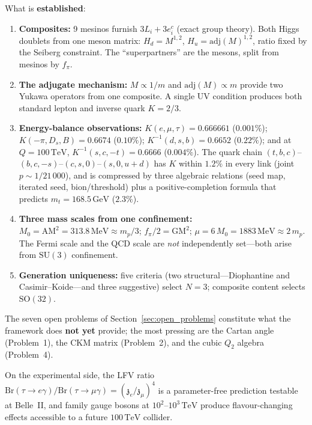 \documentclass[aps,prd,twocolumn,showpacs,preprintnumbers,superscriptaddress,floatfix]{revtex4-2}
\newcommand{\SU}{\mathrm{SU}}
\newcommand{\SO}{\mathrm{SO}}
\newcommand{\adj}{\mathrm{adj}}
\newcommand{\MeV}{\,\mathrm{MeV}}
\newcommand{\GeV}{\,\mathrm{GeV}}
\newcommand{\TeV}{\,\mathrm{TeV}}
\newcommand{\zch}{\mathfrak{z}}
\begin{document}
What is \textbf{established}:
\begin{enumerate}
  \item \textbf{Composites:} 9 mesinos furnish $3L_i + 3e_i^c$
    (exact group theory).
    Both Higgs doublets from one meson matrix:
    $H_d = M^{1,2}$, $H_u = \adj(M)^{1,2}$, ratio fixed by the
    Seiberg constraint.
    The ``superpartners'' are the mesons, split from mesinos by
    $f_\pi$.

  \item \textbf{The adjugate mechanism:} $M \propto 1/m$ and
    $\adj(M) \propto m$ provide two Yukawa operators from one
    composite.
    A single UV condition produces both standard lepton and
    inverse quark $K = 2/3$.

  \item \textbf{Energy-balance observations:}
    $K(e,\mu,\tau) = 0.666661$ ($0.001\%$);
    $K(-\pi, D_s, B) = 0.6674$ ($0.10\%$);
    $K^{-1}(d,s,b) = 0.6652$ ($0.22\%$);
    and at $Q = 100\TeV$, $K^{-1}(s,c,-t) = 0.6666$ ($0.004\%$).
    The quark chain
    $(t,b,c)$--$(b,c,-s)$--$(c,s,0)$--$(s,0,u{+}d)$
    has $K$ within $1.2\%$ in every link (joint $p \sim
    1/21\,000$), and is compressed by three algebraic relations
    (seed map, iterated seed, bion/threshold) plus a
    positive-completion formula that predicts
    $m_t = 168.5\GeV$ ($2.3\%$).

  \item \textbf{Three mass scales from one confinement:}
    $M_0 = \mathrm{AM}^2 = 313.8\MeV \approx m_p/3$;
    $f_\pi/2 = \mathrm{GM}^2$;
    $\mu = 6\,M_0 = 1883\MeV \approx 2\,m_p$.
    The Fermi scale and the QCD scale are \emph{not} independently
    set---both arise from $\SU(3)$ confinement.

  \item \textbf{Generation uniqueness:} five criteria
    (two structural---Diophantine and Casimir--Koide---and three
    suggestive) select $N = 3$; composite content selects
    $\SO(32)$.
\end{enumerate}

The seven open problems of Section~\ref{sec:open_problems}
constitute what the framework does \textbf{not yet} provide;
the most pressing are the Cartan angle (Problem~1), the
CKM matrix (Problem~2), and the cubic $Q_2$ algebra
(Problem~4).

On the experimental side, the LFV ratio
$\mathrm{Br}(\tau \to e\gamma)/\mathrm{Br}(\tau \to \mu\gamma)
= (\zch_e/\zch_\mu)^4$ is a parameter-free prediction testable
at Belle~II, and family gauge bosons at $10^2$--$10^3\TeV$
produce flavour-changing effects accessible to a future
$100\TeV$ collider.
\end{document}
